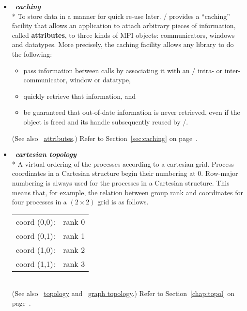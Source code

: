 \begin{itemize}
\label{glossary:caching}
\item  ~\hypertarget{glossary:caching}{\emph{\textbf{caching}}} \\*
To store data in a manner for quick re-use later.
\MPI/ provides a ``caching'' facility that allows an application to
attach arbitrary pieces of information, called {\bf attributes}, to
three kinds of MPI objects: communicators, windows and datatypes.
More precisely, the caching
facility allows any library to do the following:
\begin{itemize}
\item
  pass information between calls by associating it
  with an \MPI/ intra- or in\-ter-\-com\-mun\-i\-ca\-tor, 
window or datatype,
\item quickly retrieve that information, and
\item
 be guaranteed that out-of-date information is never retrieved, even if
 the object is freed and its handle subsequently reused by \MPI/.
\end{itemize}
(See also ~\hyperlink{glossary:attributes}{attributes}.)
Refer to Section~\ref{sec:caching} on page~\pageref{sec:caching}.

\label{glossary:cartesian_topology}
\item  ~\hypertarget{glossary:cartesian_topology}{\emph{\textbf{cartesian topology}}} \\*
A virtual ordering of the processes according to a cartesian grid.
Process coordinates in a Cartesian structure begin their numbering at $0$.
Row-major numbering is always used for the processes in a
Cartesian structure. This means that, for example, the relation
between group rank and coordinates for four processes in
a $(2 \times 2)$ grid is as follows.\\[2.0ex]
\hspace*{\parindent}
\begin{tabular}{ll}
 coord (0,0): & rank 0 \\
 coord (0,1): & rank 1 \\
 coord (1,0): & rank 2 \\
 coord (1,1): & rank 3 \\
\end{tabular} \\
(See also ~\hyperlink{glossary:topology}{topology} and ~\hyperlink{glossary:graph_topology}{graph topology}.)
Refer to Section~\ref{chap:topol} on page~\pageref{chap:topol}.


\end{itemize}
